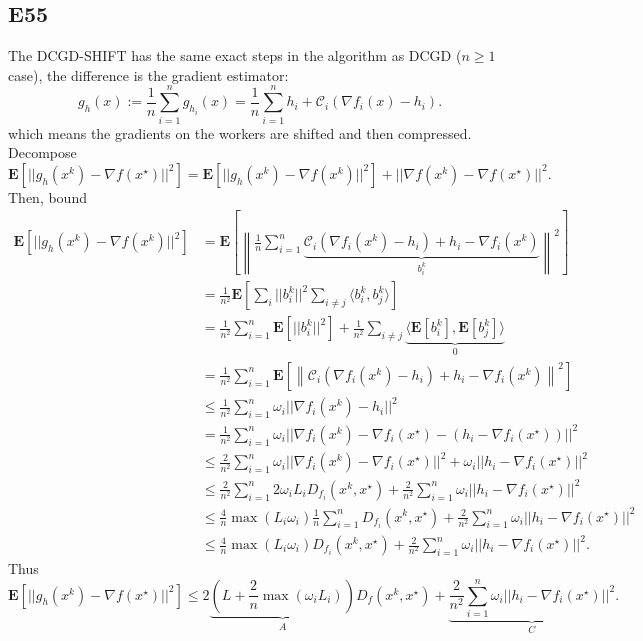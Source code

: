 \documentclass[12pt]{article}
\begin{document}
\subsection*{E55}
The DCGD-SHIFT has the same exact steps in the algorithm as DCGD ($n\geq 1$ case), the difference is the gradient estimator:
\begin{equation}
    g_h(x) := \frac{1}{n} \sum_{i=1}^n g_{h_i}(x) = \frac{1}{n} \sum_{i=1}^n h_i + \mathcal{C}_i(\nabla f_i(x) - h_i).
    \label{dcgd_shift_estimator}
\end{equation}
which means the gradients on the workers are shifted and then compressed. Decompose
\begin{equation*}
    \mathbf{E}\left[||g_h(x^k) - \nabla f(x^\star) ||^2\right] = \mathbf{E}\left[||g_h(x^k) - \nabla f(x^k) ||^2\right] + ||\nabla f(x^k) - \nabla f(x^\star) ||^2.
\end{equation*}
Then, bound
\begin{equation*}
    \begin{split}
        \mathbf{E}\left[||g_h(x^k) - \nabla f(x^k) ||^2\right] &= \mathbf{E}\left[\left\|\frac{1}{n} \sum_{i=1}^n \underbrace{\mathcal{C}_i(\nabla f_i(x^k) - h_i) + h_i - \nabla f_i(x^k)}_{b_i^k}  \right\|^2\right] \\
        &= \frac{1}{n^2} \mathbf{E}\left[\sum_i ||b_i^k||^2 \sum_{i\neq j} \langle b_i^k, b_j^k\rangle\right] \\
        &= \frac{1}{n^2} \sum_{i=1}^n \mathbf{E}\left[||b_i^k||^2\right] + \frac{1}{n^2} \sum_{i \neq j} \underbrace{\langle \mathbf{E}[b_i^k], \mathbf{E}[b_j^k] \rangle}_{0} \\
        &= \frac{1}{n^2} \sum_{i=1}^n \mathbf{E}\left[\left\| \mathcal{C}_i(\nabla f_i(x^k) - h_i) + h_i - \nabla f_i(x^k) \right\|^2\right] \\
        &\leq \frac{1}{n^2} \sum_{i=1}^n \omega_i || \nabla f_i(x^k) - h_i ||^2 \\
        &= \frac{1}{n^2} \sum_{i=1}^n \omega_i || \nabla f_i(x^k) - \nabla f_i(x^\star) - (h_i - \nabla f_i(x^\star))||^2 \\
        &\leq \frac{2}{n^2} \sum_{i=1}^n \omega_i||\nabla f_i(x^k) - \nabla f_i(x^\star)||^2 + \omega_i || h_i - \nabla f_i(x^\star) ||^2 \\
        &\leq \frac{2}{n^2} \sum_{i=1}^n 2 \omega_i L_i D_{f_i}(x^k,x^\star) + \frac{2}{n^2} \sum_{i=1}^n \omega_i || h_i - \nabla f_i(x^\star) ||^2 \\
        &\leq \frac{4}{n} \max(L_i \omega_i) \frac{1}{n} \sum_{i=1}^n D_{f_i}(x^k, x^\star) + \frac{2}{n^2} \sum_{i=1}^n \omega_i || h_i - \nabla f_i(x^\star) ||^2 \\
        &\leq \frac{4}{n} \max(L_i \omega_i) D_{f_i}(x^k, x^\star) + \frac{2}{n^2} \sum_{i=1}^n \omega_i || h_i - \nabla f_i(x^\star) ||^2.
    \end{split}
\end{equation*}
Thus
\begin{equation*}
    \mathbf{E}\left[||g_h(x^k) - \nabla f(x^\star) ||^2\right] \leq 2 \underbrace{(L + \frac{2}{n}\max(\omega_i L_i))}_{A}D_f(x^k, x^\star) + \underbrace{\frac{2}{n^2}\sum_{i=1}^n \omega_i ||h_i - \nabla f_i(x^\star)||^2}_{C}.
\end{equation*}
\end{document}
